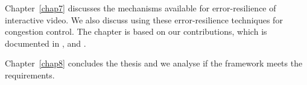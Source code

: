 
Chapter~\ref{chap7} discusses the mechanisms available for error-resilience of
interactive video. We also discuss using these error-resilience techniques for
congestion control. The chapter is based on our contributions, which is
documented in , and .


Chapter~\ref{chap8} concludes the thesis and we analyse if the framework meets
the requirements.
